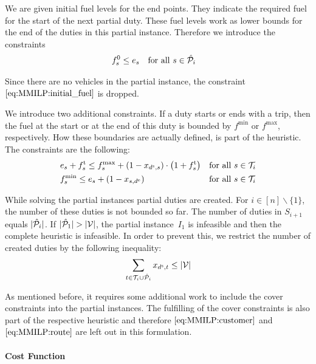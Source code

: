 We are given initial fuel levels for the end points. They indicate the required fuel for the start of the next partial duty. These fuel levels work as lower bounds for the end of the duties in this partial instance. Therefore we introduce the constraints
\begin{align}
	& f^0_s \leq e_s && \text{for all } s\in\hat{\mathcal{P}}_i \label{eq:CMILP:final_fuel}
\end{align}

Since there are no vehicles in the partial instance, the constraint $\eqref{eq:MMILP:initial_fuel}$ is dropped.

We introduce two additional constraints. If a duty starts or ends with a trip, then the fuel at the start or at the end of this duty is bounded by $f^{\min}$ or $f^{\max}$, respectively. How these boundaries are actually defined, is part of the heuristic. The constraints are the following:
\begin{align}
	& e_s + f^{\operatorname{t}}_s \leq f^{\max}_s + \left(1-x_{d^{\operatorname{s}},s}\right)\cdot\left(1+f^{\operatorname{t}}_s\right) && \text{for all } s\in\mathcal{T}_i \label{eq:CMILP:fmax} \\
	& f^{\min}_s \leq e_s + \left(1-x_{s,d^{\operatorname{e}}}\right) && \text{for all } s\in\mathcal{T}_i \label{eq:CMILP:fmin}
\end{align}

While solving the partial instances partial duties are created. For ${i\in[n]\backslash\{1\}}$, the number of these duties is not bounded so far. The number of duties in $S_{i+1}$ equals $\vert\hat{\mathcal{P}}_i\vert$. If ${\vert\hat{\mathcal{P}}_1\vert > \vert\mathcal{V}\vert}$, the partial instance~$I_1$ is infeasible and then the complete heuristic is infeasible. In order to prevent this, we restrict the number of created duties by the following inequality:
\begin{align}
	\sum_{t\in\mathcal{T}_i\cup\hat{\mathcal{P}}_i} x_{d^{\operatorname{s}},t} \leq \vert\mathcal{V}\vert \label{eq:CMILP:strengthening}
\end{align}

As mentioned before, it requires some additional work to include the cover constraints into the partial instances. The fulfilling of the cover constraints is also part of the respective heuristic and therefore $\eqref{eq:MMILP:customer}$ and $\eqref{eq:MMILP:route}$ are left out in this formulation.

\paragraph{Cost Function} \parfill

